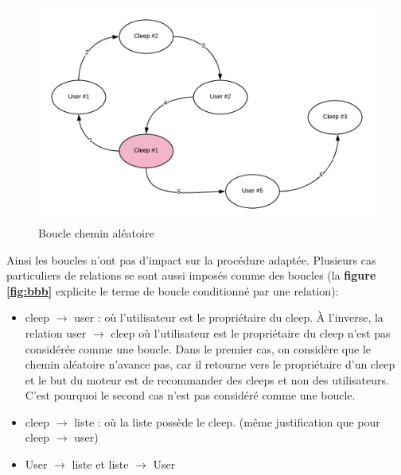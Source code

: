 \documentclass{article} %
\begin{document}
\begin{figure}[!h]
 \centering
 \includegraphics[keepaspectratio = true,scale=0.7]{boucle}
 \caption{Boucle chemin aléatoire}
 \label{fig:boucle}
\end{figure}
\newpage
Ainsi les boucles n'ont pas d'impact sur la procédure adaptée. Plusieurs cas particuliers de relations se sont aussi imposés comme des boucles (la \textbf{figure \ref{fig:bbb}} explicite le terme de boucle conditionné par une relation):
\begin{itemize}
 \item cleep $\rightarrow$ user : où l'utilisateur est le propriétaire du cleep. À l'inverse, la relation user $\rightarrow$ cleep où l'utilisateur est le propriétaire du cleep n'est pas considérée comme une boucle. Dans le premier cas, on considère que le chemin aléatoire n'avance pas, car il retourne vers le propriétaire d'un cleep et le but du moteur est de recommander des cleeps et non des utilisateurs. C'est pourquoi le second cas n'est pas considéré comme une boucle.
 \item cleep $\rightarrow$ liste : où la liste possède le cleep. (même justification que pour cleep $\rightarrow$ user)
 \item User  $\rightarrow$  liste et liste  $\rightarrow$  User
\end{itemize}
\end{document}
